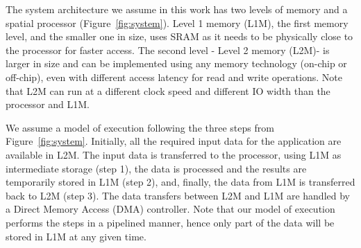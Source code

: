 \label{ssec:system_under_analysis}
The system architecture we assume in this work has two levels of memory and a spatial processor (Figure~\ref{fig:system}). Level 1 memory (L1M)\footnotemark, the first memory level, and the smaller one in size, uses SRAM as it needs to be physically close to the processor for faster access. The second level - Level 2 memory (L2M)\footnotemark[\value{footnote}] - is larger in size and can be implemented using any memory technology (on-chip or off-chip), even with different access latency for read and write operations. Note that L2M can run at a different clock speed and different IO width than the processor and L1M.


We assume a model of execution following the three steps from Figure~\ref{fig:system}. Initially, all the required input data for the application are available in L2M. The input data is transferred to the processor, using L1M as intermediate storage (step 1), the data is processed and the results are temporarily stored in L1M (step 2), and, finally, the data from L1M is transferred back to L2M (step 3). The data transfers between L2M and L1M are handled by a Direct Memory Access (DMA) controller. Note that our model of execution performs the steps in a pipelined manner, hence only part of the data will be stored in L1M at any given time.


